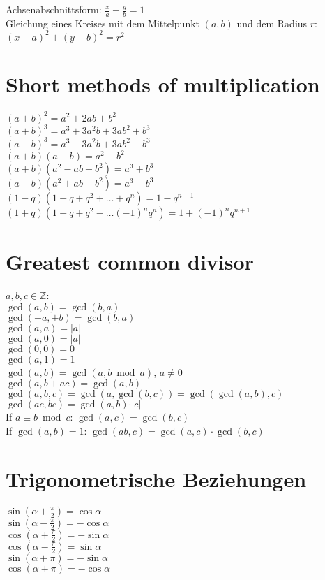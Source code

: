 \documentclass[a4paper, 10pt]{scrartcl}
\begin{document}
Achsenabschnittsform: $\frac{x}{a} + \frac{y}{b} = 1$\\

Gleichung eines Kreises mit dem Mittelpunkt $(a, b)$
und dem Radius $r$:\\
$(x - a)^{2} + (y - b)^{2} = r^{2}$\\

\section*{Short methods of multiplication}
$(a + b)^{2} = a^{2} + 2ab + b^{2}$\\
$(a + b)^{3} = a^{3} + 3a^{2}b + 3ab^{2} + b^{3}$\\
$(a - b)^{3} = a^{3} - 3a^{2}b + 3ab^{2} - b^{3}$\\
$(a + b)(a - b) = a^{2} - b^{2}$\\
$(a + b)(a^{2} - ab + b^{2}) = a^{3} + b^{3}$\\
$(a - b)(a^{2} + ab + b^{2}) = a^{3} - b^{3}$\\
$(1 - q)(1 + q + q^{2} + \dots + q^{n}) = 1 - q^{n+1}$\\
$(1 + q)(1 - q + q^{2} - \dots (-1)^{n}q^{n}) = 1 + (-1)^{n}q^{n+1}$\\

\section*{Greatest common divisor}
$a, b, c\in \mathbb{Z}$:\\
$\gcd(a, b) = \gcd(b, a)$\\
$\gcd(\pm a, \pm b) = \gcd(b, a)$\\
$\gcd(a, a) = \vert a\vert$\\
$\gcd(a, 0) = \vert a\vert$\\
$\gcd(0, 0) = 0$\\
$\gcd(a, 1) = 1$\\
$\gcd(a, b) = \gcd(a, b\bmod a)$, $a\neq 0$\\
$\gcd(a, b + ac) = \gcd(a, b)$\\
$\gcd(a, b, c) = \gcd(a, \gcd(b, c)) = \gcd(\gcd(a, b), c)$\\
$\gcd(ac, bc) = \gcd(a, b)\cdot\vert c\vert$\\
If $a\equiv b\bmod c$: $\gcd(a, c) = \gcd(b, c)$\\
If $\gcd(a, b) = 1$: $\gcd(ab, c) = \gcd(a, c)\cdot\gcd(b, c)$\\

\section*{Trigonometrische Beziehungen}
$\sin{(\alpha + \frac{\pi}{2})} = \cos{\alpha}$\\
$\sin{(\alpha - \frac{\pi}{2})} = -\cos{\alpha}$\\
$\cos{(\alpha + \frac{\pi}{2})} = -\sin{\alpha}$\\
$\cos{(\alpha - \frac{\pi}{2})} = \sin{\alpha}$\\
$\sin{(\alpha + \pi)} = -\sin{\alpha}$\\
$\cos{(\alpha + \pi)} = -\cos{\alpha}$\\
\end{document}
